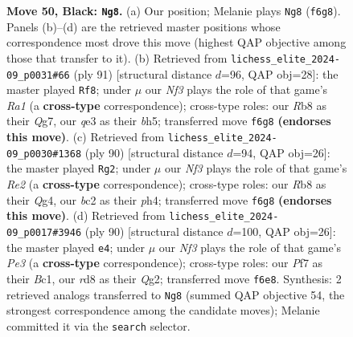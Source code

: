 \documentclass[11pt]{article}
\begin{document}
\begin{figure}[p]
\caption{\textbf{Move 50, Black: \texttt{Ng8}.} (a) Our position; Melanie plays \texttt{Ng8} (\texttt{f6g8}). Panels (b)--(d) are the retrieved master positions whose correspondence most drove this move (highest QAP objective among those that transfer to it). (b) Retrieved from \texttt{lichess\_elite\_2024-09\_p0031\#66} (ply 91) [structural distance $d$=96, QAP obj=28]: the master played \texttt{Rf8}; under $\mu$ our \emph{Nf3} plays the role of that game's \emph{Ra1} (a \textbf{cross-type} correspondence); cross-type roles: our \emph{R}b8 as their \emph{Q}g7, our \emph{q}e3 as their \emph{b}h5; transferred move \texttt{f6g8} \textbf{(endorses this move)}. (c) Retrieved from \texttt{lichess\_elite\_2024-09\_p0030\#1368} (ply 90) [structural distance $d$=94, QAP obj=26]: the master played \texttt{Rg2}; under $\mu$ our \emph{Nf3} plays the role of that game's \emph{Re2} (a \textbf{cross-type} correspondence); cross-type roles: our \emph{R}b8 as their \emph{Q}g4, our \emph{b}c2 as their \emph{p}h4; transferred move \texttt{f6g8} \textbf{(endorses this move)}. (d) Retrieved from \texttt{lichess\_elite\_2024-09\_p0017\#3946} (ply 90) [structural distance $d$=100, QAP obj=26]: the master played \texttt{e4}; under $\mu$ our \emph{Nf3} plays the role of that game's \emph{Pe3} (a \textbf{cross-type} correspondence); cross-type roles: our \emph{P}f7 as their \emph{B}c1, our \emph{r}d8 as their \emph{Q}g2; transferred move \texttt{f6e8}. Synthesis: 2 retrieved analogs transferred to \texttt{Ng8} (summed QAP objective 54, the strongest correspondence among the candidate moves); Melanie committed it via the \texttt{search} selector.}
\label{fig:thought-m99}
\end{figure}

\clearpage
\end{document}
